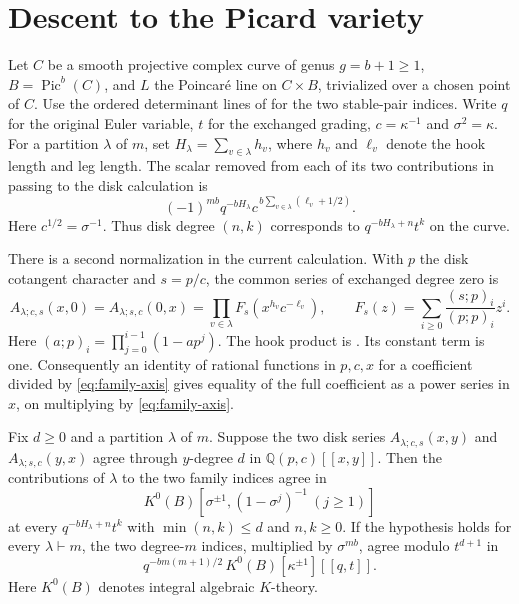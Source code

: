\section{Descent to the Picard variety}\label{sec:family}

Let $C$ be a smooth projective complex curve of genus $g=b+1\geq1$,
$B=\operatorname{Pic}^{b}(C)$, and $L$ the Poincar\'e line on
$C\times B$, trivialized over a chosen point of $C$.
Use the ordered determinant lines of \cite[Lemma~2.1]{W1} for
the two stable-pair indices. Write $q$ for the original Euler
variable, $t$ for the exchanged grading, $c=\kappa^{-1}$ and
$\sigma^2=\kappa$. For a partition $\lambda$ of $m$, set
$H_\lambda=\sum_{v\in\lambda}h_v$, where $h_v$ and $\ell_v$
denote the hook length and leg length. The scalar removed from each
of its two contributions in passing to the disk calculation is
\begin{equation}\label{eq:family-scalar}
 (-1)^{mb}q^{-bH_\lambda}
 c^{\,b\sum_{v\in\lambda}(\ell_v+1/2)}.
\end{equation}
Here $c^{1/2}=\sigma^{-1}$. Thus disk degree $(n,k)$ corresponds
to $q^{-bH_\lambda+n}t^k$ on the curve.

There is a second normalization in the current calculation. With
$p$ the disk cotangent character and $s=p/c$, the common series of
exchanged degree zero is
\begin{equation}\label{eq:family-axis}
 A_{\lambda;c,s}(x,0)= A_{\lambda;s,c}(0,x)
 =\prod_{v\in\lambda}F_s(x^{h_v}c^{-\ell_v}),\qquad
 F_s(z)=\sum_{i\geq0}\frac{(s;p)_i}{(p;p)_i}z^i .
\end{equation}
Here $(a;p)_i=\prod_{j=0}^{i-1}(1-ap^j)$.
The hook product is \cite[Lemma~5.1]{W1}. Its constant term is one.
Consequently an identity of rational functions in $p,c,x$ for a
coefficient divided by \eqref{eq:family-axis} gives equality of the
full coefficient as a power series in $x$, on multiplying by
\eqref{eq:family-axis}.

\begin{proposition}\label{prop:family}
Fix $d\geq0$ and a partition $\lambda$ of $m$. Suppose the two disk
series $A_{\lambda;c,s}(x,y)$ and $A_{\lambda;s,c}(y,x)$ agree
through $y$-degree $d$ in $\mathbb Q(p,c)[[x,y]]$. Then the
contributions of $\lambda$ to the two family indices agree in
\[
 K^0(B)[\sigma^{\pm1},(1-\sigma^j)^{-1}\ (j\geq1)]
\]
at every $q^{-bH_\lambda+n}t^k$ with $\min(n,k)\leq d$ and
$n,k\geq0$. If the hypothesis holds for every $\lambda\vdash m$,
the two degree-$m$ indices, multiplied by $\sigma^{mb}$, agree
modulo $t^{d+1}$ in
\[
 q^{-bm(m+1)/2}\,K^0(B)[\kappa^{\pm1}][[q,t]].
\]
Here $K^0(B)$ denotes integral algebraic $K$-theory.
\end{proposition}


